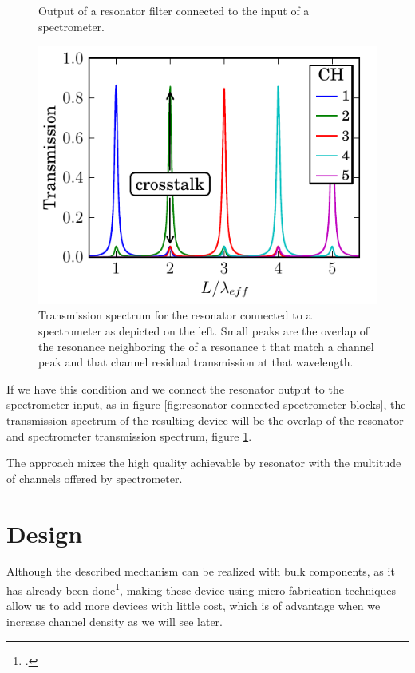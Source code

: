 \documentclass[12pt,twoside,english]{book}
\renewcommand{\~}{\perispomeni}%
\numberwithin{equation}{section}
\numberwithin{figure}{section}
\begin{document}
\begin{figure}[h]
	\begin{minipage}[t]{0.49\columnwidth}%
	
	\caption{Output of a resonator filter connected to the input of a spectrometer.}
	\label{fig:resonator connected spectrometer blocks}
	\end{minipage}\hfill
	\begin{minipage}[t]{0.49\columnwidth}%
	\includegraphics{ring-enhaced-tog}
	\caption{Transmission spectrum for the resonator connected to a spectrometer as depicted on the left. Small peaks are the overlap of the resonance neighboring the of a resonance t that match a channel peak and that channel residual transmission at that wavelength.}
	\label{fig:spectrum resonator connected spectrometer}
	\end{minipage}
\end{figure}
If we have this condition and we connect the resonator output to the spectrometer input, as in figure \ref{fig:resonator connected spectrometer blocks}, the transmission spectrum of the resulting device will be the overlap of the resonator and spectrometer transmission spectrum, figure \ref{fig:spectrum resonator connected spectrometer}.

The approach mixes the high quality achievable by resonator with the multitude of channels offered by spectrometer.

\section{Design}
Although the described mechanism can be realized with bulk components, as it has already been done\footcite{bajraszewski:2008p1743}, making these device using micro-fabrication techniques allow us to add more devices with little cost, which is of advantage when we increase channel density as we will see later.
\end{document}
